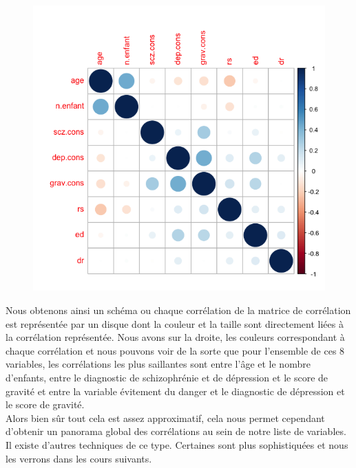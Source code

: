 \begin{figure}[H]\begin{center}\includegraphics[scale=0.5]{ilu/corgraph.png}\end{center}\end{figure}

Nous obtenons ainsi un schéma ou chaque corrélation de la matrice de corrélation est représentée par un disque dont la couleur et la taille sont directement liées à la corrélation représentée. Nous avons sur la droite, les couleurs correspondant à chaque corrélation et nous pouvons voir de la sorte que pour l'ensemble de ces 8 variables, les corrélations les plus saillantes sont entre l'âge et le nombre d'enfants, entre le diagnostic de schizophrénie et de dépression et le score de gravité et entre la variable évitement du danger et le diagnostic de dépression et le score de gravité.\newline
\\
Alors bien sûr tout cela est assez approximatif, cela nous permet cependant d'obtenir un panorama global des corrélations au sein de notre liste de variables. Il existe
d'autres techniques de ce type. Certaines sont plus sophistiquées et nous les verrons dans les
cours suivants.


\newpage


